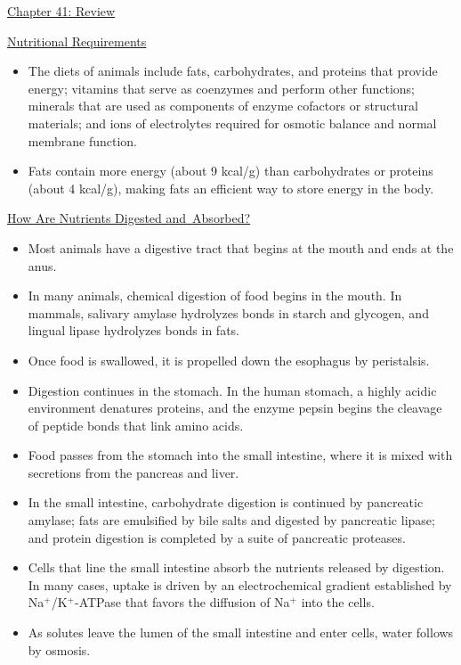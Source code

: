 \documentclass[12pt,letterpaper]{article}
\begin{document}
\hypertarget{41.r}{}
\begin{probbox}{\hyperlink{41}{Chapter 41: Review}}{
    \hyperlink{41.1}{Nutritional Requirements}
    \begin{itemize}
        \item The diets of animals include fats, carbohydrates, and proteins that provide energy; vitamins that serve as coenzymes and perform other functions; minerals that are used as components of enzyme cofactors or structural materials; and ions of electrolytes required for osmotic balance and normal membrane function. 
        \item Fats contain more energy (about 9 kcal/g) than carbohydrates or proteins (about 4 kcal/g), making fats an efficient way to store energy in the body.
    \end{itemize}
    \hyperlink{41.3}{How Are Nutrients Digested and Absorbed?}
    \begin{itemize}
        \item Most animals have a digestive tract that begins at the mouth and ends at the anus. 
        \item In many animals, chemical digestion of food begins in the mouth. In mammals, salivary amylase hydrolyzes bonds in starch and glycogen, and lingual lipase hydrolyzes bonds in fats. 
        \item Once food is swallowed, it is propelled down the esophagus by peristalsis. 
        \item Digestion continues in the stomach. In the human stomach, a highly acidic environment denatures proteins, and the enzyme pepsin begins the cleavage of peptide bonds that link amino acids. 
        \item Food passes from the stomach into the small intestine, where it is mixed with secretions from the pancreas and liver. 
        \item In the small intestine, carbohydrate digestion is continued by pancreatic amylase; fats are emulsified by bile salts and digested by pancreatic lipase; and protein digestion is completed by a suite of pancreatic proteases. 
        \item Cells that line the small intestine absorb the nutrients released by digestion. In many cases, uptake is driven by an electrochemical gradient established by Na\(^+\)/K\(^+\)-ATPase that favors the diffusion of Na\(^+\) into the cells. 
        \item As solutes leave the lumen of the small intestine and enter cells, water follows by osmosis. 

\end{itemize}}
\end{probbox}
\end{document}
